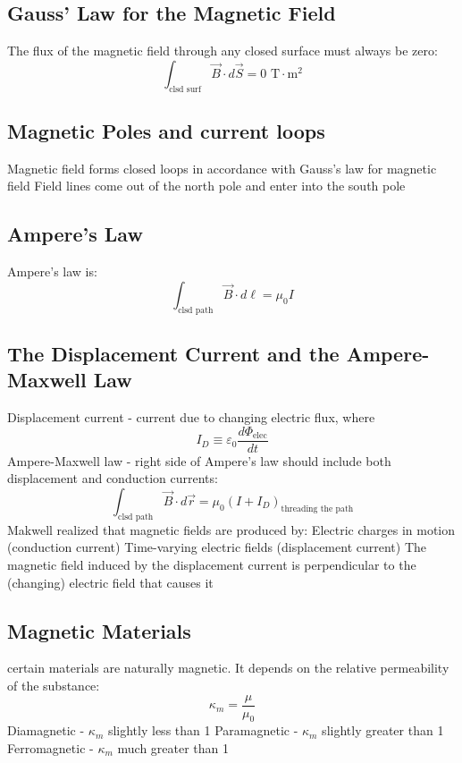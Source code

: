 \documentclass[twocolumn]{article}
\begin{document}
\subsection{Gauss' Law for the Magnetic Field}
\begin{outline}
	\1 The flux of the magnetic field through any closed surface must always be zero: \[\int_{\text{clsd surf}}\vec{B}\cdot d\vec{S}=0\text{ T}\cdot\text{m}^2\]

\end{outline}
\subsection{Magnetic Poles and current loops}
\begin{outline}
	\1 Magnetic field forms closed loops in accordance with Gauss's law for magnetic field 
	\1 Field lines come out of the north pole and enter into the south pole
\end{outline}
\subsection{Ampere's Law}
\begin{outline}
	\1 Ampere's law is: \[\int_{\text{clsd path}}\vec{B}\cdot d\ell=\mu_0I\]
\end{outline}
\subsection{The Displacement Current and the Ampere-Maxwell Law}
\begin{outline}
	\1 Displacement current - current due to changing electric flux, where \[I_D\equiv\varepsilon_0\dfrac{d\Phi_{\text{elec}}}{dt}\]
	\1 Ampere-Maxwell law - right side of Ampere's law should include both displacement and conduction currents: \[\int_{\text{clsd path}}\vec{B}\cdot d\vec{r}=\mu_0(I+I_D)_{\text{threading the path}}\]
	\1 Makwell realized that magnetic fields are produced by: 
		\2 Electric charges in motion (conduction current)
		\2 Time-varying electric fields (displacement current)
	\1 The magnetic field induced by the displacement current is perpendicular to the (changing) electric field that causes it
	
\end{outline}
\subsection{Magnetic Materials}
\begin{outline}
	\1 certain materials are naturally magnetic. It depends on the relative permeability of the substance: \[\kappa_m=\dfrac{\mu}{\mu_0}\]
		\2 Diamagnetic - $\kappa_m$ slightly less than 1
		\2 Paramagnetic - $\kappa_m$ slightly greater than 1
		\2 Ferromagnetic - $\kappa_m$ much greater than 1
\end{outline}
\end{document}
